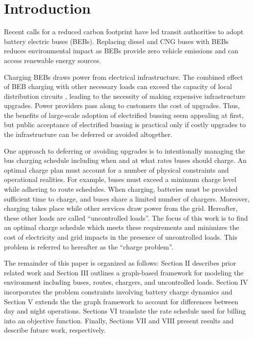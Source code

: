 \section{Introduction}
Recent calls for a reduced carbon footprint have led transit authorities to adopt battery electric buses (BEBs). Replacing diesel and CNG buses with BEBs reduces environmental impact \cite{zhou_optimization_2018} as BEBs provide zero vehicle emissions and can access renewable energy sources\cite{poornesh_comparative_2020}.

\par Charging BEBs draws power from electrical infrastructure. The combined effect of BEB charging with other necessary loads can exceed the capacity of local distribution circuits \cite{stahleder_impact_2019}\cite{deb_impact_2017}\cite{boonraksa_impact_2019}, leading to the necessity of making  expensive infrastructure upgrades. Power providers pass along to customers the cost of upgrades.  Thus, the benefits of large-scale adoption of electrified bussing seem appealing at first, but public acceptance of electrified bussing is practical only if costly upgrades to the infrastructure can be deferred or avoided altogether.

\par One approach to deferring or avoiding upgrades is to intentionally managing the bus charging schedule including when and at what rates buses should charge. An optimal charge plan must account for a number of physical constraints and operational realities. For example, buses must exceed a minimum charge level while adhering to route schedules. When charging, batteries must be provided sufficient time to charge, and buses share a limited number of chargers.  Moreover, charging takes place while other services draw power from the grid.  Hereafter, these other loads are called ``uncontrolled loads''. The focus of this work is to find an optimal charge schedule which meets these requirements and minimizes the cost of electricity and grid impacts in the presence of uncontrolled loads. This problem is referred to hereafter as the ``charge problem''.

\par The remainder of this paper is organized as follows: Section II describes prior related work and Section III outlines a graph-based framework for modeling the environment including buses, routes, chargers, and uncontrolled loads. Section IV incorporates the problem constraints involving battery charge dynamics and Section V extends the the graph framework to account for differences between day and night operations.  Sections VI translate the rate schedule used for billing into an objective function. Finally, Sections VII and VIII present results and describe future work, respectively.
